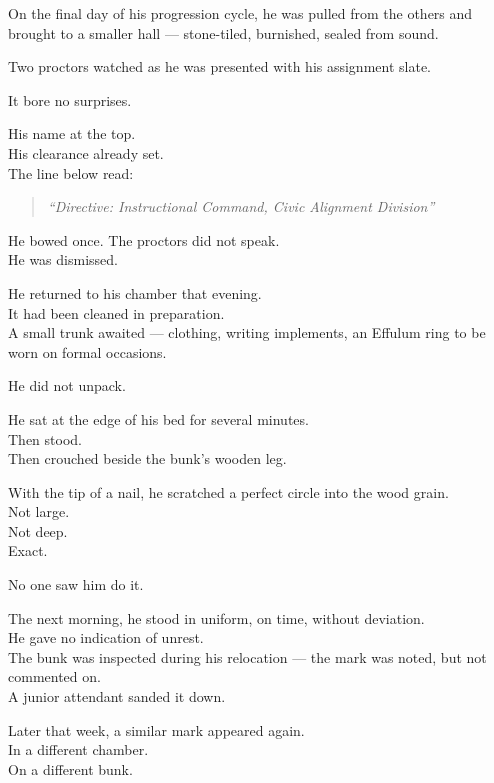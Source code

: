 \documentclass[12pt]{article}
\begin{document}
\vspace{1em}

On the final day of his progression cycle, he was pulled from the others and brought to a smaller hall — stone-tiled, burnished, sealed from sound.

Two proctors watched as he was presented with his assignment slate.

It bore no surprises.

His name at the top.\\
His clearance already set.\\
The line below read:

\begin{quote}
\textit{“Directive: Instructional Command, Civic Alignment Division”}
\end{quote}

He bowed once. The proctors did not speak.\\
He was dismissed.

\vspace{1em}

He returned to his chamber that evening.\\
It had been cleaned in preparation.\\
A small trunk awaited — clothing, writing implements, an Effulum ring to be worn on formal occasions.

He did not unpack.

He sat at the edge of his bed for several minutes.\\
Then stood.\\
Then crouched beside the bunk’s wooden leg.

With the tip of a nail, he scratched a perfect circle into the wood grain.\\
Not large.\\
Not deep.\\
Exact.

\vspace{1em}

No one saw him do it.

The next morning, he stood in uniform, on time, without deviation.\\
He gave no indication of unrest.\\
The bunk was inspected during his relocation — the mark was noted, but not commented on.\\
A junior attendant sanded it down.

Later that week, a similar mark appeared again.\\
In a different chamber.\\
On a different bunk.
\end{document}
